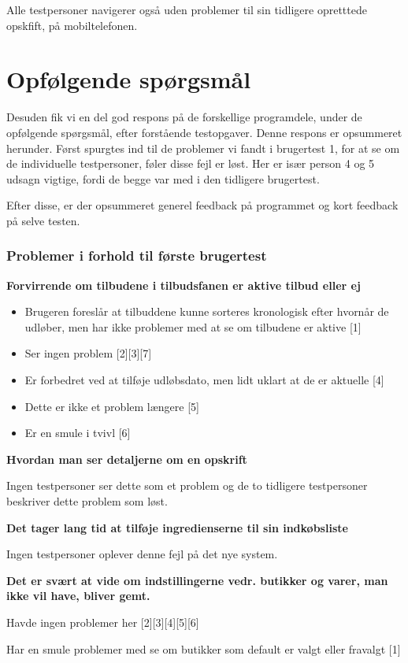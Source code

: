 Alle testpersoner navigerer også uden problemer til sin tidligere opretttede opskfift, på mobiltelefonen.

\section{Opfølgende spørgsmål}
Desuden fik vi en del god respons på de forskellige programdele, under de opfølgende spørgsmål, efter forstående testopgaver.
Denne respons er opsummeret herunder.
Først spurgtes ind til de problemer vi fandt i brugertest 1, for at se om de individuelle testpersoner, føler disse fejl er løst. 
Her er især person 4 og 5 udsagn vigtige, fordi de begge var med i den tidligere brugertest.

Efter disse, er der opsummeret generel feedback på programmet og kort feedback på selve testen.

\subsubsection{Problemer i forhold til første brugertest}
\textbf{Forvirrende om tilbudene i tilbudsfanen er aktive tilbud eller ej}
\begin{itemize}
	\item Brugeren foreslår at tilbuddene kunne sorteres kronologisk efter hvornår de udløber, men har ikke problemer med at se om tilbudene er aktive [1]
	\item Ser ingen problem [2][3][7]
	\item Er forbedret ved at tilføje udløbsdato, men lidt uklart at de er aktuelle [4]
	\item Dette er ikke et problem længere [5]
	\item Er en smule i tvivl [6]
\end{itemize}
\textbf{Hvordan man ser detaljerne om en opskrift}

Ingen testpersoner ser dette som et problem og de to tidligere testpersoner beskriver dette problem som løst.

\textbf{Det tager lang tid at tilføje ingredienserne til sin indkøbsliste}

Ingen testpersoner oplever denne fejl på det nye system.

\textbf{Det er svært at vide om indstillingerne vedr. butikker og varer, man ikke vil have, bliver gemt.}

Havde ingen problemer her [2][3][4][5][6]

Har en smule problemer med se om butikker som default er valgt eller fravalgt [1]

